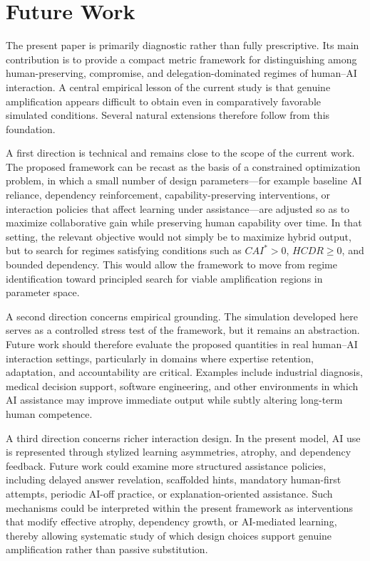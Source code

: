 \documentclass[11pt,a4paper]{article}
\begin{document}
\section{Future Work}

The present paper is primarily diagnostic rather than fully prescriptive. Its main contribution is to provide a compact metric framework for distinguishing among human-preserving, compromise, and delegation-dominated regimes of human--AI interaction. A central empirical lesson of the current study is that genuine amplification appears difficult to obtain even in comparatively favorable simulated conditions. Several natural extensions therefore follow from this foundation.

A first direction is technical and remains close to the scope of the current work. The proposed framework can be recast as the basis of a constrained optimization problem, in which a small number of design parameters---for example baseline AI reliance, dependency reinforcement, capability-preserving interventions, or interaction policies that affect learning under assistance---are adjusted so as to maximize collaborative gain while preserving human capability over time. In that setting, the relevant objective would not simply be to maximize hybrid output, but to search for regimes satisfying conditions such as $CAI^*>0$, $HCDR \ge 0$, and bounded dependency. This would allow the framework to move from regime identification toward principled search for viable amplification regions in parameter space.

A second direction concerns empirical grounding. The simulation developed here serves as a controlled stress test of the framework, but it remains an abstraction. Future work should therefore evaluate the proposed quantities in real human--AI interaction settings, particularly in domains where expertise retention, adaptation, and accountability are critical. Examples include industrial diagnosis, medical decision support, software engineering, and other environments in which AI assistance may improve immediate output while subtly altering long-term human competence.

A third direction concerns richer interaction design. In the present model, AI use is represented through stylized learning asymmetries, atrophy, and dependency feedback. Future work could examine more structured assistance policies, including delayed answer revelation, scaffolded hints, mandatory human-first attempts, periodic AI-off practice, or explanation-oriented assistance. Such mechanisms could be interpreted within the present framework as interventions that modify effective atrophy, dependency growth, or AI-mediated learning, thereby allowing systematic study of which design choices support genuine amplification rather than passive substitution.
\end{document}
